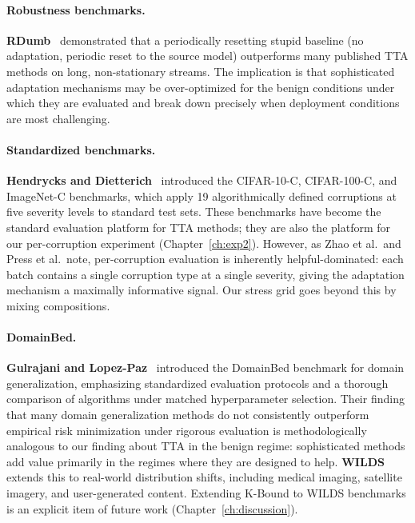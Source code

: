 \paragraph{Robustness benchmarks.}
\textbf{RDumb}~\cite{press2023rdumb} demonstrated that a periodically
resetting stupid baseline (no adaptation, periodic reset to the source model)
outperforms many published TTA methods on long, non-stationary streams.
The implication is that sophisticated adaptation mechanisms may be
over-optimized for the benign conditions under which they are evaluated and
break down precisely when deployment conditions are most challenging.

\paragraph{Standardized benchmarks.}
\textbf{Hendrycks and Dietterich}~\cite{hendrycks2019benchmarking} introduced
the CIFAR-10-C, CIFAR-100-C, and ImageNet-C benchmarks, which apply 19
algorithmically defined corruptions at five severity levels to standard test
sets.
These benchmarks have become the standard evaluation platform for TTA methods;
they are also the platform for our per-corruption experiment
(Chapter~\ref{ch:exp2}).
However, as Zhao et al.\ and Press et al.\ note, per-corruption evaluation
is inherently helpful-dominated: each batch contains a single corruption type
at a single severity, giving the adaptation mechanism a maximally informative
signal.
Our stress grid goes beyond this by mixing compositions.

\paragraph{DomainBed.}
\textbf{Gulrajani and Lopez-Paz}~\cite{gulrajani2021domainbed} introduced the
DomainBed benchmark for domain generalization, emphasizing standardized
evaluation protocols and a thorough comparison of algorithms under matched
hyperparameter selection.
Their finding that many domain generalization methods do not consistently
outperform empirical risk minimization under rigorous evaluation is
methodologically analogous to our finding about TTA in the benign regime:
sophisticated methods add value primarily in the regimes where they are
designed to help.
\textbf{WILDS}~\cite{koh2021wilds} extends this to real-world distribution
shifts, including medical imaging, satellite imagery, and user-generated
content.
Extending K-Bound to WILDS benchmarks is an explicit item of future work
(Chapter~\ref{ch:discussion}).

